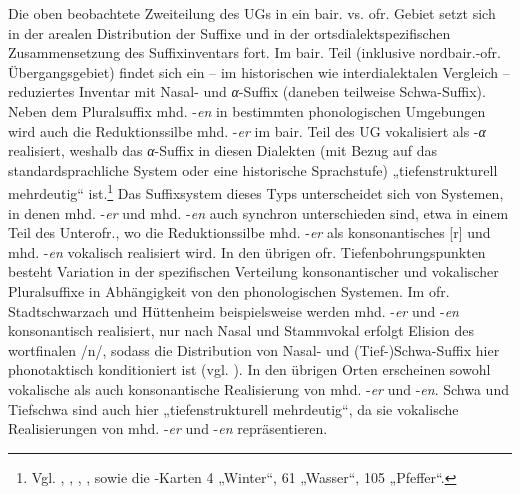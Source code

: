 Die oben beobachtete Zweiteilung des UGs in ein bair. vs. ofr. Gebiet setzt sich in der arealen Distribution der Suffixe und in der ortsdialektspezifischen Zusammensetzung des Suffixinventars fort. Im bair. Teil (inklusive nordbair.-ofr. Übergangsgebiet) findet sich ein -- im historischen wie interdialektalen Vergleich -- reduziertes Inventar mit Nasal- und \textit{α}{}-Suffix (daneben teilweise Schwa-Suffix). Neben dem Pluralsuffix mhd. -\textit{en} in bestimmten phonologischen Umgebungen wird auch die Reduktionssilbe mhd. -\textit{er} im bair. Teil des UG vokalisiert als -\textit{α} realisiert, weshalb das \textit{α}{}-Suffix in diesen Dialekten (mit Bezug auf das standardsprachliche System oder eine historische Sprachstufe) „tiefenstrukturell mehrdeutig“ \citep[127]{Rowley1997} ist.\footnote{Vgl. \citet[113]{Haas1983}, \citet[§50c3 und Karte 26]{Kranzmayer1956}, \citet[65]{RennKönig2006}, \citet[82 und Karte 19]{Rowley1997}, \citet[257 und Karte 9]{Werner1961} sowie die \citealt{WA}-Karten 4 „Winter“, 61 „Wasser“, 105 „Pfeffer“.} Das Suffixsystem dieses Typs unterscheidet sich von Systemen, in denen mhd. -\textit{er} und mhd. -\textit{en} auch synchron unterschieden sind, etwa in einem Teil des Unterofr., wo die Reduktionssilbe mhd. -\textit{er} als konsonantisches [r] und mhd. -\textit{en} vokalisch realisiert wird. In den übrigen ofr. Tiefenbohrungspunkten besteht Variation in der spezifischen Verteilung konsonantischer und vokalischer Pluralsuffixe in Abhängigkeit von den phonologischen Systemen. Im ofr. Stadtschwarzach und Hüttenheim beispielsweise werden mhd. -\textit{er} und -\textit{en} konsonantisch realisiert, nur nach Nasal und Stammvokal erfolgt Elision des wortfinalen /n/, sodass die Distribution von Nasal- und (Tief-)Schwa-Suffix hier phonotaktisch konditioniert ist (vgl. ). In den übrigen Orten erscheinen sowohl vokalische als auch konsonantische Realisierung von mhd. -\textit{er} und -\textit{en}. Schwa und Tiefschwa sind auch hier „tiefenstrukturell mehrdeutig“, da sie vokalische Realisierungen von mhd. -\textit{er} und -\textit{en} repräsentieren.

